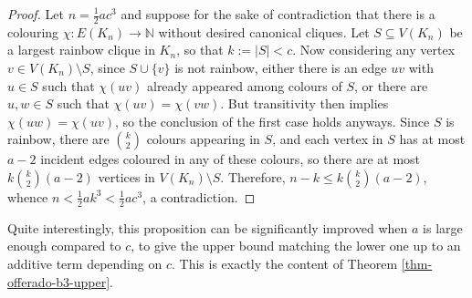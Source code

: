 \documentclass[11pt]{article}
\theoremstyle{plain}
\theoremstyle{definition}
\newcommand{\N}{\mathbb{N}}
\begin{document}
\begin{proof}
    Let $n=\frac{1}{2}ac^3$ and suppose for the sake of contradiction that there is a colouring $\chi:E(K_n)\to\N$ without desired canonical cliques. Let $S\subseteq V(K_n)$ be a largest rainbow clique in $K_n$, so that $k:=|S|<c$. Now considering any vertex $v\in V(K_n)\setminus S$, since $S\cup \{v\}$ is not rainbow, either there is an edge $uv$ with $u\in S$ such that $\chi(uv)$ already appeared among colours of $S$, or there are $u,w\in S$ such that $\chi(uv)=\chi(vw)$. But transitivity then implies $\chi(uw)=\chi(uv)$, so the conclusion of the first case holds anyways. Since $S$ is rainbow, there are $\binom{k}{2}$ colours appearing in $S$, and each vertex in $S$ has at most $a-2$ incident edges coloured in any of these colours, so there are at most $k\binom{k}{2}(a-2)$ vertices in $V(K_n)\setminus S$. Therefore, $n-k\le k\binom{k}{2}(a-2)$, whence $n<\frac{1}{2}ak^3<\frac{1}{2}ac^3$, a contradiction.
\end{proof}

Quite interestingly, this proposition can be significantly improved when $a$ is large enough compared to $c$, to give the upper bound matching the lower one up to an additive term depending on $c$. This is exactly the content of Theorem \ref{thm-offerado-b3-upper}.
\end{document}

